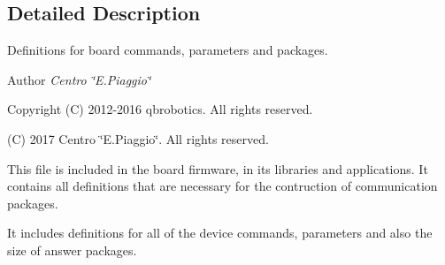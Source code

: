 \subsection{Detailed Description}
Definitions for board commands, parameters and packages. 

\begin{DoxyAuthor}{Author}
{\itshape Centro \char`\"{}\+E.\+Piaggio\char`\"{}} 
\end{DoxyAuthor}
\begin{DoxyCopyright}{Copyright}
(C) 2012-\/2016 qbrobotics. All rights reserved. 

(C) 2017 Centro \char`\"{}\+E.\+Piaggio\char`\"{}. All rights reserved.
\end{DoxyCopyright}
This file is included in the board firmware, in its libraries and applications. It contains all definitions that are necessary for the contruction of communication packages.

It includes definitions for all of the device commands, parameters and also the size of answer packages. 